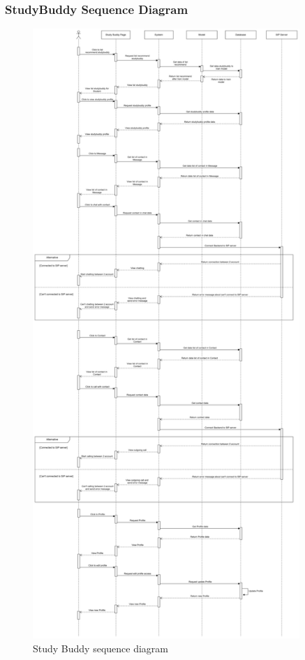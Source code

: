 \subsubsection{StudyBuddy Sequence Diagram}
\begin{figure}[H]
    \centering
    \includegraphics[width=0.9\textwidth, height=0.9\textheight]{image/StudentStudyBuddySequence.png} 
    \caption{Study Buddy sequence diagram}
    \label{fig:studyBuddy_sequence}
\end{figure}

